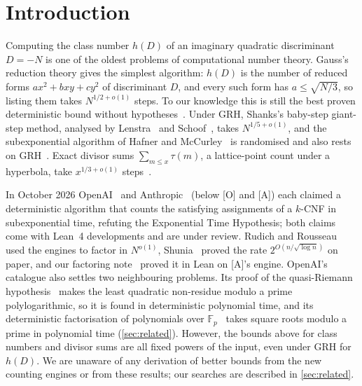\documentclass[10pt]{amsart}
\theoremstyle{plain}
\theoremstyle{definition}
\theoremstyle{remark}
\numberwithin{equation}{section}
\newcommand{\A}{\textup{[A]}}
\newcommand{\Oa}{\textup{[O]}}
\newcommand{\rate}{2^{O(n/\sqrt{\log n})}}
\begin{document}
\maketitle

\section{Introduction}\label{sec:intro}

Computing the class number $h(D)$ of an imaginary quadratic discriminant $D=-N$ is one of the oldest
problems of computational number theory. Gauss's reduction theory gives the simplest algorithm: $h(D)$ is
the number of reduced forms $ax^2+bxy+cy^2$ of discriminant $D$, and every such form has $a\le\sqrt{N/3}$,
so listing them takes $N^{1/2+o(1)}$ steps. To our knowledge this is still the best proven
deterministic bound without hypotheses~\cite[\S5]{Len92}. Under GRH, Shanks's baby-step giant-step
method, analysed by Lenstra~\cite{Len82} and Schoof~\cite[\S3]{Sch82}, takes $N^{1/5+o(1)}$, and the
subexponential algorithm of Hafner and McCurley~\cite{HM89} is randomised and also rests on GRH~\cite[\S5]{Len92}.
Exact divisor sums $\sum_{m\le x}\tau(m)$, a lattice-point count under a hyperbola, take $x^{1/3+o(1)}$
steps~\cite{Sla12,TCH12}.

In October 2026 OpenAI~\cite{OpenAI26} and Anthropic~\cite{Anthropic26} (below \Oa{} and \A) each
claimed a deterministic algorithm that counts the satisfying assignments of a $k$-CNF in subexponential
time, refuting the Exponential Time Hypothesis; both claims come with Lean~4 developments and are under
review. Rudich and Rousseau~\cite{RR26} used the engines to factor in $N^{o(1)}$, Shunia~\cite{Shu26}
proved the rate $\rate$ on paper, and our factoring note~\cite{TulFac26} proved it in Lean on \A's engine.
OpenAI's catalogue also settles two neighbouring problems. Its proof of the quasi-Riemann
hypothesis~\cite{OAI003}
makes the least quadratic non-residue modulo a prime polylogarithmic, so it is found in deterministic
polynomial time, and its deterministic factorisation of polynomials over $\mathbb{F}_p$~\cite{OAI142}
takes square roots modulo a prime in polynomial time (\cref{sec:related}).
However, the bounds above for class numbers and divisor sums are all fixed powers of the input, even under
GRH for $h(D)$. We are unaware of any derivation of better bounds from the new counting engines or from
these results; our searches are described in \cref{sec:related}.
\end{document}
